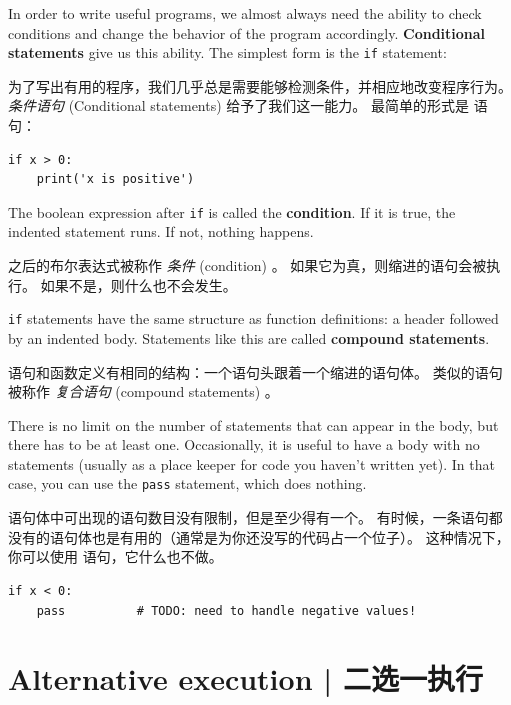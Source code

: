 {{{{  
  

In order to write useful programs, we almost always need the ability
to check conditions and change the behavior of the program
accordingly.  {\bf Conditional statements} give us this ability.  The
simplest form is the {\tt if} statement:

为了写出有用的程序，我们几乎总是需要能够检测条件，并相应地改变程序行为。
{\em 条件语句} (Conditional statements) 给予了我们这一能力。
最简单的形式是  语句：

\begin{lstlisting}
if x > 0:
    print('x is positive')
\end{lstlisting}

%
The boolean expression after {\tt if} is
called the {\bf condition}.  If it is true, the indented
statement runs.  If not, nothing happens.

 之后的布尔表达式被称作 {\em 条件} (condition) 。
如果它为真，则缩进的语句会被执行。 如果不是，则什么也不会发生。
  

{\tt if} statements have the same structure as function definitions:
a header followed by an indented body.  Statements like this are
called {\bf compound statements}.

 语句和函数定义有相同的结构：一个语句头跟着一个缩进的语句体。
类似的语句被称作 {\em 复合语句} (compound statements) 。

There is no limit on the number of statements that can appear in
the body, but there has to be at least one.
Occasionally, it is useful to have a body with no statements (usually
as a place keeper for code you haven't written yet).  In that
case, you can use the {\tt pass} statement, which does nothing.

语句体中可出现的语句数目没有限制，但是至少得有一个。
有时候，一条语句都没有的语句体也是有用的（通常是为你还没写的代码占一个位子）。
这种情况下，你可以使用  语句，它什么也不做。
  


\begin{lstlisting}
if x < 0:
    pass          # TODO: need to handle negative values!
\end{lstlisting}
%

\section{Alternative execution  |  二选一执行}
\label{alternative.execution}
    

}}}}
